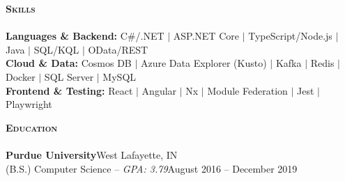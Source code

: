 \documentclass[letterpaper, 10pt]{article}
\newcommand{\lineunder}{
    \vspace*{-8pt} \\
    \hspace*{-18pt} \hrulefill \\
}
\newcommand{\header}[1]{
    \vspace*{10pt}
    {
        \hspace*{-18pt}\vspace*{4pt}
        {\large\textbf{\textsc{#1}}}
    }
    \vspace*{-6pt} \lineunder
}
\begin{document}
\header{Skills}
\textbf{Languages \& Backend:} C\#/.NET $\vert$ ASP.NET Core $\vert$ TypeScript/Node.js $\vert$ Java $\vert$ SQL/KQL $\vert$ OData/REST\\
\textbf{Cloud \& Data:} Cosmos DB $\vert$ Azure Data Explorer (Kusto) $\vert$ Kafka $\vert$ Redis $\vert$ Docker $\vert$ SQL Server $\vert$ MySQL\\
\textbf{Frontend \& Testing:} React $\vert$ Angular $\vert$ Nx $\vert$ Module Federation $\vert$ Jest $\vert$ Playwright

\header{Education}
\textbf{Purdue University}\hfill West Lafayette, IN\\
(B.S.) Computer Science -- \textit{GPA: 3.79}\hfill August 2016 -- December 2019
\end{document}
